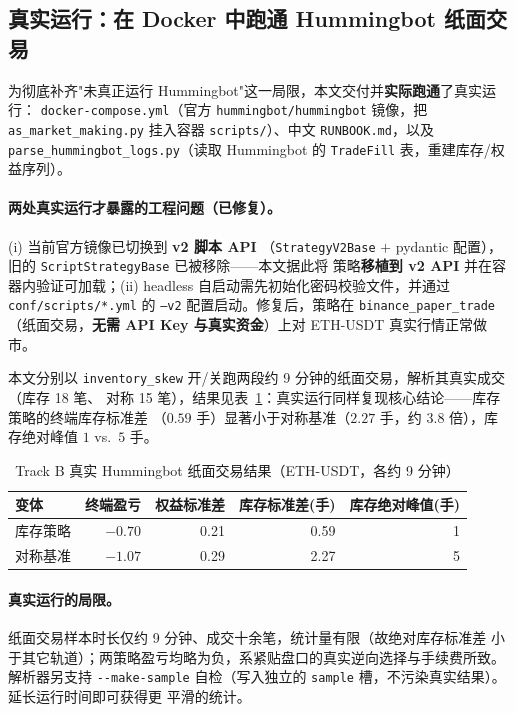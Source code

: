 \documentclass[11pt]{ctexart}
\begin{document}
\subsection{真实运行：在 Docker 中跑通 Hummingbot 纸面交易}
\label{sec:trackB_real}
为彻底补齐"未真正运行 Hummingbot"这一局限，本文交付并\textbf{实际跑通}了真实运行：
\texttt{docker-compose.yml}（官方 \texttt{hummingbot/hummingbot} 镜像，把
\texttt{as\_market\_making.py} 挂入容器 \texttt{scripts/}）、中文 \texttt{RUNBOOK.md}，以及
\texttt{parse\_hummingbot\_logs.py}（读取 Hummingbot 的 \texttt{TradeFill} 表，重建库存/权益序列）。

\paragraph{两处真实运行才暴露的工程问题（已修复）。}(i) 当前官方镜像已切换到 \textbf{v2 脚本 API}
（\texttt{StrategyV2Base} $+$ pydantic 配置），旧的 \texttt{ScriptStrategyBase} 已被移除——本文据此将
策略\textbf{移植到 v2 API} 并在容器内验证可加载；(ii) headless 自启动需先初始化密码校验文件，并通过
\texttt{conf/scripts/*.yml} 的 \texttt{--v2} 配置启动。修复后，策略在 \texttt{binance\_paper\_trade}
（纸面交易，\textbf{无需 API Key 与真实资金}）上对 ETH-USDT 真实行情正常做市。

本文分别以 \texttt{inventory\_skew} 开/关跑两段约 9 分钟的纸面交易，解析其真实成交（库存 18 笔、
对称 15 笔），结果见表~\ref{tab:trackB_real}：真实运行同样复现核心结论——库存策略的终端库存标准差
（$0.59$ 手）显著小于对称基准（$2.27$ 手，约 $3.8$ 倍），库存绝对峰值 $1$ vs.\ $5$ 手。

\begin{table}[H]
\centering
\caption{Track B 真实 Hummingbot 纸面交易结果（ETH-USDT，各约 9 分钟）}
\label{tab:trackB_real}
\begin{tabular}{lrrrr}
\toprule
变体 & 终端盈亏 & 权益标准差 & 库存标准差(手) & 库存绝对峰值(手) \\
\midrule
库存策略 & $-0.70$ & 0.21 & 0.59 & 1 \\
对称基准 & $-1.07$ & 0.29 & 2.27 & 5 \\
\bottomrule
\end{tabular}
\end{table}

\paragraph{真实运行的局限。}纸面交易样本时长仅约 9 分钟、成交十余笔，统计量有限（故绝对库存标准差
小于其它轨道）；两策略盈亏均略为负，系紧贴盘口的真实逆向选择与手续费所致。解析器另支持
\texttt{-{}-make-sample} 自检（写入独立的 \texttt{sample} 槽，不污染真实结果）。延长运行时间即可获得更
平滑的统计。
\end{document}
